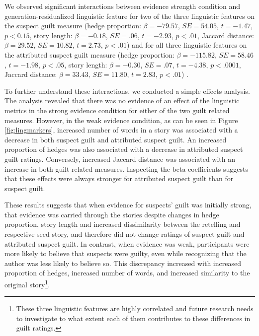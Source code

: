 \documentclass[10pt,letterpaper]{article}
\newcommand{\ek}[1]{\textcolor{Orange}{[ek: #1]}}
\begin{document}
We observed significant interactions between evidence strength condition and generation-residualized linguistic feature for two of the three linguistic features on the suspect guilt measure (hedge proportion: $\beta = -79.57$, $SE = 54.05$, $t = -1.47$, $p < 0.15$, story length: $\beta = -0.18$, $SE = .06$, $t = -2.93$, $p < .01$, Jaccard distance: $\beta = 29.52$, $SE = 10.82$, $t = 2.73$, $p < .01$)
 and for all three linguistic features on the attributed suspect guilt measure (hedge proportion: $\beta = -115.82$, $SE = 58.46$, $t = -1.98$, $p < .05$, story length: $\beta = -0.30$, $SE = .07$, $t = -4.38$, $p < .0001$, Jaccard distance: $\beta = 33.43$, $SE = 11.80$, $t = 2.83$, $p < .01$)
. 

To further understand these interactions, we conducted a simple effects analysis. The analysis revealed that there was no evidence of an effect of the linguistic metrics in the strong evidence condition for either of the two guilt related measures. 
However, in the weak evidence condition, as can be seen in Figure \ref{fig:lingmarkers},  increased number of words in a story was associated with a decrease in both suspect guilt and attributed suspect guilt. An increased proportion of hedges was also associated with a decrease in attributed suspect guilt ratings. Conversely, increased Jaccard distance was associated with an increase in both guilt related measures. Inspecting the beta coefficients suggests that these effects were always stronger for attributed suspect guilt than for suspect guilt. 

These results suggests that when evidence for suspects' guilt was initially strong, that evidence was carried through the stories despite changes in hedge proportion, story length and increased dissimilarity between the retelling and respective seed story, and therefore did not change ratings of suspect guilt and attributed suspect guilt. In contrast, when evidence was weak, participants were more likely to believe that suspects were guilty, even while recognizing that the author was less likely to believe so. This discrepancy increased with increased proportion of hedges, increased number of words, and increased similarity to the original story\footnote{These three linguistic features are highly correlated and future research needs to investigate to what extent each of them contributes to these differences in guilt ratings.}.
\end{document}
